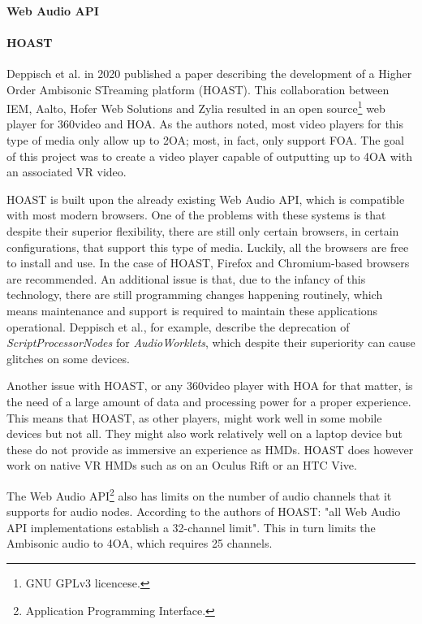 \paragraph{Web Audio API}

\paragraph{HOAST}

Deppisch et al. \cite{deppisch2020hoast} in 2020 published a paper describing the development of a Higher Order Ambisonic STreaming platform (HOAST). This collaboration between IEM, Aalto, Hofer Web Solutions and Zylia resulted in an open source\footnote{GNU GPLv3 licencese.} web player for 360\textdegree  video and HOA. As the authors noted, most video players for this type of media only allow up to 2OA; most, in fact, only support FOA. The goal of this project was to create a video player capable of outputting up to 4OA with an associated VR video. 

HOAST is built upon the already existing Web Audio API, which is compatible with most modern browsers. One of the problems with these systems is that despite their superior flexibility, there are still only certain browsers, in certain configurations, that support this type of media. Luckily, all the browsers are free to install and use. In the case of HOAST, Firefox and Chromium-based browsers are recommended. An additional issue is that, due to the infancy of this technology, there are still programming changes happening routinely, which means maintenance and support is required to maintain these applications operational. Deppisch et al., for example, describe the deprecation of \textit{ScriptProcessorNodes} for \textit{AudioWorklets}, which despite their superiority can cause glitches on some devices. 

Another issue with HOAST, or any 360\textdegree video player with HOA for that matter, is the need of a large amount of data and processing power for a proper experience. This means that HOAST, as other players, might work well in some mobile devices but not all. They might also work relatively well on a laptop device but these do not provide as immersive an experience as HMDs. HOAST does however work on native VR HMDs such as on an Oculus Rift or an HTC Vive. 

The Web Audio API\footnote{Application Programming Interface.} also has limits on the number of audio channels that it supports for audio nodes. According to the authors of HOAST: "all Web Audio API implementations establish a 32-channel limit". This in turn limits the Ambisonic audio to 4OA, which requires 25 channels. 

